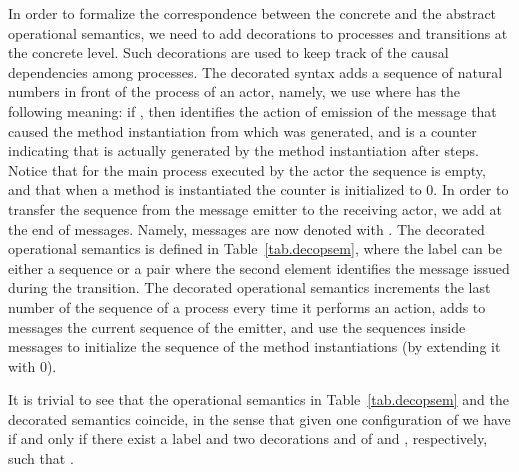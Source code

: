 \documentclass{LMCS}
\theoremstyle{plain}\newtheorem{proposition}[thm]{Proposition}
\theoremstyle{plain}\newtheorem{lemma}[thm]{Lemma}
\theoremstyle{plain}\newtheorem{theorem}[thm]{Theorem}
\theoremstyle{plain}\newtheorem{corollary}[thm]{Corollary}
\newcommand{\actsl}{}
\begin{document}
In order to formalize the correspondence between the concrete and the abstract 
operational semantics, we need to add decorations to processes and transitions
at the concrete level. Such decorations are used to keep track of the causal
dependencies among processes.
The decorated syntax adds a sequence of natural numbers in front of the
process of an actor, namely, we use 
where  has the following meaning: if , then  
identifies the action of emission of the message that caused the method instantiation
from which  was generated, and  is a counter indicating that  is actually 
generated by the method instantiation after  steps.
Notice that for the main process executed by the actor  the sequence
 is empty, and that when a method is instantiated the counter
 is initialized to 0. 
In order to transfer the sequence from the message emitter to the 
receiving actor, we add  at the end of messages.
Namely, messages are now denoted with .
The decorated operational semantics  
is defined in Table~\ref{tab.decopsem}, where the label  can be
either a sequence  or a pair  where the
second element identifies the message issued during the transition.
The decorated operational semantics increments the last number of the 
sequence of a process every time it performs an action, adds to messages
the current sequence of the emitter, and use the sequences
inside messages to initialize the sequence of the method instantiations
(by extending it with 0).

It is trivial to see that the operational semantics in Table~\ref{tab.decopsem}
and the decorated semantics coincide, in the sense that given
one configuration  of {\actsl} we have 
if and only if there exist a label 
and two decorations  and  of  and , respectively,
such that .
\end{document}
